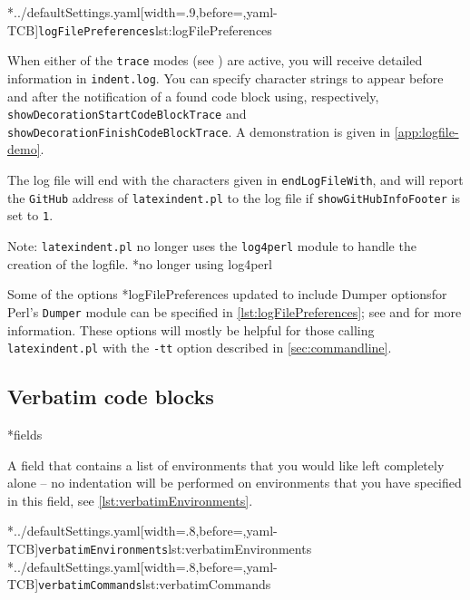 	\cmhlistingsfromfile*[style=logFilePreferences,]*{../defaultSettings.yaml}[width=.9\linewidth,before=\centering,yaml-TCB]{\texttt{logFilePreferences}}{lst:logFilePreferences}

	When%
	 either of the
	\texttt{trace} modes (see ) are active, you will receive
	detailed information in \texttt{indent.log}. You can specify character strings to
	appear before and after the notification of a found code block using, respectively,
	\texttt{showDecorationStartCodeBlockTrace} and \texttt{showDecorationFinishCodeBlockTrace}. A demonstration is given in
	\vref{app:logfile-demo}.

	The log file will end with the characters given in \texttt{endLogFileWith}, and will
	report the \texttt{GitHub} address of \texttt{latexindent.pl} to the log file if
	\texttt{showGitHubInfoFooter} is set to \texttt{1}.

	Note: \texttt{latexindent.pl} no longer uses the \texttt{log4perl} module to handle
	the creation of the logfile.%
	*{no longer using log4perl}

	Some of the options%
	*{logFilePreferences updated to include Dumper options}for Perl's \texttt{Dumper} module can
	be specified in \cref{lst:logFilePreferences}; see \cite{dumper} and
	\cite{dumperdemo} for more information. These options will mostly be helpful for
	those calling \texttt{latexindent.pl} with the \texttt{-tt} option described
	in \cref{sec:commandline}.

\subsection{Verbatim code blocks}
*{fields}

	A field that contains a list of environments that you would like left completely alone --
	no indentation will be performed on environments that you have specified in this field,
	see \cref{lst:verbatimEnvironments}.

	\begin{cmhtcbraster}[raster column skip=.1\linewidth]
		\cmhlistingsfromfile[style=verbatimEnvironments]*{../defaultSettings.yaml}[width=.8\linewidth,before=\centering,yaml-TCB]{\texttt{verbatimEnvironments}}{lst:verbatimEnvironments}
		\cmhlistingsfromfile[style=verbatimCommands]*{../defaultSettings.yaml}[width=.8\linewidth,before=\centering,yaml-TCB]{\texttt{verbatimCommands}}{lst:verbatimCommands}
	\end{cmhtcbraster}

